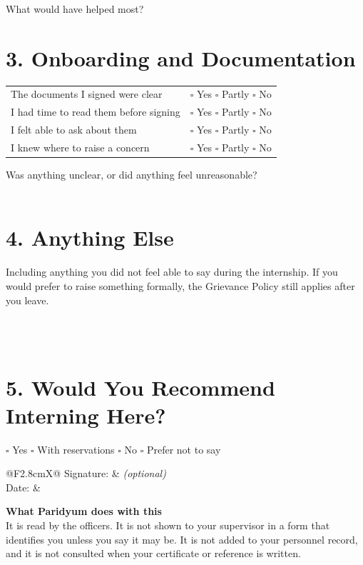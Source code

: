 \documentclass{paridyum}
\begin{document}
\vspace{0.6em}
What would have helped most? \\
\dkblank[15cm]

\section*{3. Onboarding and Documentation}
\begin{tabularx}{\linewidth}{@{}Xr@{}}
The documents I signed were clear         & $\square$ Yes \quad $\square$ Partly \quad $\square$ No \\
I had time to read them before signing    & $\square$ Yes \quad $\square$ Partly \quad $\square$ No \\
I felt able to ask about them             & $\square$ Yes \quad $\square$ Partly \quad $\square$ No \\
I knew where to raise a concern           & $\square$ Yes \quad $\square$ Partly \quad $\square$ No \\
\end{tabularx}

\vspace{0.6em}
Was anything unclear, or did anything feel unreasonable? \\
\dkblank[15cm] \\[1em]
\dkblank[15cm]

\section*{4. Anything Else}
Including anything you did not feel able to say during the internship. If you
would prefer to raise something formally, the Grievance Policy still applies
after you leave.

\vspace{0.5em}
\dkblank[15cm] \\[1em]
\dkblank[15cm] \\[1em]
\dkblank[15cm]

\section*{5. Would You Recommend Interning Here?}
$\square$ Yes \quad $\square$ With reservations \quad $\square$ No \quad
$\square$ Prefer not to say

\vspace{1.2em}
\begin{tabularx}{\linewidth}{@{}F{2.8cm}X@{}}
Signature: & \dkblank[6cm] \textit{(optional)} \\[1em]
Date:      & \dkblank[6cm]
\end{tabularx}

\vspace{1em}
\begin{infobox}
\textbf{What Paridyum does with this}\\[0.4em]
It is read by the officers. It is not shown to your supervisor in a form that
identifies you unless you say it may be. It is not added to your personnel
record, and it is not consulted when your certificate or reference is written.
\end{infobox}
\end{document}
